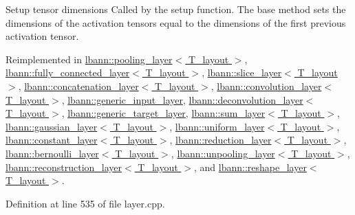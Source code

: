 Setup tensor dimensions Called by the setup function. The base method sets the dimensions of the activation tensors equal to the dimensions of the first previous activation tensor. 

Reimplemented in \hyperlink{classlbann_1_1pooling__layer_a5de83fe60224067c132b0f1d53024b57}{lbann\+::pooling\+\_\+layer$<$ T\+\_\+layout $>$}, \hyperlink{classlbann_1_1fully__connected__layer_aaf38e55b232b1bb2a6336ff1807b5a17}{lbann\+::fully\+\_\+connected\+\_\+layer$<$ T\+\_\+layout $>$}, \hyperlink{classlbann_1_1slice__layer_ac43785fc01d6cf6e49d3677adfaac297}{lbann\+::slice\+\_\+layer$<$ T\+\_\+layout $>$}, \hyperlink{classlbann_1_1concatenation__layer_abc44199934950480dbde30e0b7058a78}{lbann\+::concatenation\+\_\+layer$<$ T\+\_\+layout $>$}, \hyperlink{classlbann_1_1convolution__layer_adbb45d032ad79c793a159b7ee79eef14}{lbann\+::convolution\+\_\+layer$<$ T\+\_\+layout $>$}, \hyperlink{classlbann_1_1generic__input__layer_ad117da4e6155159439826bba6657cf05}{lbann\+::generic\+\_\+input\+\_\+layer}, \hyperlink{classlbann_1_1deconvolution__layer_abec9b66f0659fd4f06a39a1e8c4bd06b}{lbann\+::deconvolution\+\_\+layer$<$ T\+\_\+layout $>$}, \hyperlink{classlbann_1_1generic__target__layer_a3a970c1b23f7367276f7061563fc8b65}{lbann\+::generic\+\_\+target\+\_\+layer}, \hyperlink{classlbann_1_1sum__layer_af7e011a8e1cd89cc9f9c0224182bfb7a}{lbann\+::sum\+\_\+layer$<$ T\+\_\+layout $>$}, \hyperlink{classlbann_1_1gaussian__layer_ab48263a742e407a8d3586ee4ece38768}{lbann\+::gaussian\+\_\+layer$<$ T\+\_\+layout $>$}, \hyperlink{classlbann_1_1uniform__layer_a60dfb64110369be8f9802c9e010cfbd1}{lbann\+::uniform\+\_\+layer$<$ T\+\_\+layout $>$}, \hyperlink{classlbann_1_1constant__layer_a147f3510683632f90bd1491f80d8ef32}{lbann\+::constant\+\_\+layer$<$ T\+\_\+layout $>$}, \hyperlink{classlbann_1_1reduction__layer_aff2c5f6112da848908baba3645408e6e}{lbann\+::reduction\+\_\+layer$<$ T\+\_\+layout $>$}, \hyperlink{classlbann_1_1bernoulli__layer_aabaf1d2ba92aa4c708d3a76d82bdbdb6}{lbann\+::bernoulli\+\_\+layer$<$ T\+\_\+layout $>$}, \hyperlink{classlbann_1_1unpooling__layer_a7fe47a0c90958329efb79aee49d6247f}{lbann\+::unpooling\+\_\+layer$<$ T\+\_\+layout $>$}, \hyperlink{classlbann_1_1reconstruction__layer_a3abb27b670b5c57f2a6b1d669a7de508}{lbann\+::reconstruction\+\_\+layer$<$ T\+\_\+layout $>$}, and \hyperlink{classlbann_1_1reshape__layer_a60fd29f11e62137a0808ffe4b3730344}{lbann\+::reshape\+\_\+layer$<$ T\+\_\+layout $>$}.



Definition at line 535 of file layer.\+cpp.


